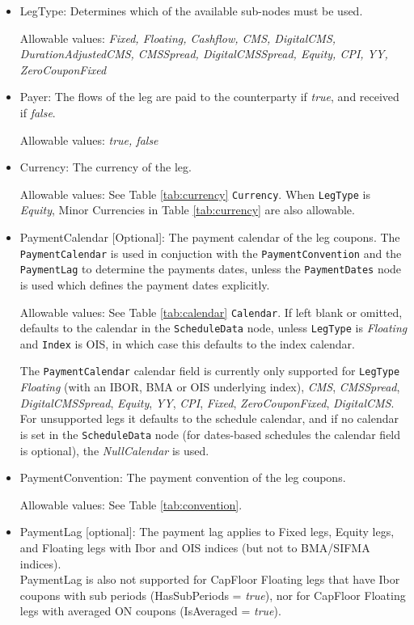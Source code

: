 \begin{itemize}
\item LegType:  Determines which of the available sub-nodes must be
  used. 

Allowable values:  \emph{Fixed, Floating, Cashflow, CMS, DigitalCMS, DurationAdjustedCMS, CMSSpread, DigitalCMSSpread, Equity, CPI, YY, ZeroCouponFixed}

\item Payer:  The flows of the leg are paid to the counterparty if
  \emph{true}, and received if \emph{false}.  

Allowable values:  \emph{true, false} 

\item Currency: The currency of the leg. 

Allowable values:  See Table \ref{tab:currency} \lstinline!Currency!. When \lstinline!LegType! is \emph{Equity}, Minor Currencies in Table \ref{tab:currency} are also allowable.

\item PaymentCalendar [Optional]: The payment calendar of the leg coupons. The \lstinline!PaymentCalendar! is used in conjuction with the \lstinline!PaymentConvention! and the \lstinline!PaymentLag! to determine the payments dates, unless the \lstinline!PaymentDates! node is used which defines the payment dates explicitly.

Allowable values: See Table \ref{tab:calendar} \lstinline!Calendar!. If left blank or omitted, defaults to the calendar in the \lstinline!ScheduleData! node, unless \lstinline!LegType! is \emph{Floating} and \lstinline!Index! is OIS, in which case this defaults to the index calendar. 

The \lstinline!PaymentCalendar! calendar field is currently only supported for \lstinline!LegType! \emph{Floating} (with an IBOR, BMA or OIS underlying index), \emph{CMS}, \emph{CMSSpread}, \emph{DigitalCMSSpread}, \emph{Equity}, \emph{YY}, \emph{CPI}, \emph{Fixed}, \emph{ZeroCouponFixed}, \emph{DigitalCMS}. For unsupported legs it defaults to the schedule calendar, and if no calendar is set in the \lstinline!ScheduleData! node (for dates-based schedules the calendar field is optional), the \emph{NullCalendar} is used. 

\item PaymentConvention: The payment convention of the leg coupons. 

Allowable values: See Table \ref{tab:convention}.

\item PaymentLag [optional]: The payment lag applies to Fixed legs, Equity legs, and Floating legs with Ibor and OIS indices (but not to BMA/SIFMA indices). \\
PaymentLag is also not supported for CapFloor Floating legs that have Ibor coupons with sub periods (HasSubPeriods = \emph{true}), nor for CapFloor Floating legs with averaged ON coupons (IsAveraged = \emph{true}).


\end{itemize}
